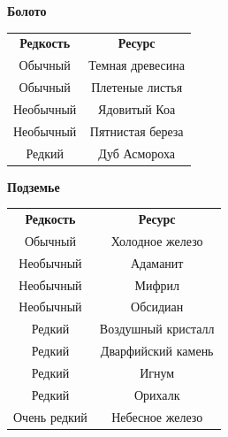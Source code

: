 \documentclass[a4paper, 9pt, twocolumn]{book}
\begin{document}
	\begin{table}[H]

		{\Large \textbf{Болото}}
		
		\centering
		
		\medspace 
		
		\begin{tabularx}{\linewidth}{C C}
			
			\textbf{Редкость} & \textbf{Ресурс} \\
			
			Обычный & Темная древесина \\
			
			Обычный & Плетеные листья \\
			
			Необычный & Ядовитый Коа \\
			
			Необычный & Пятнистая береза \\
			
			Редкий & Дуб Асмороха \\
			
		\end{tabularx}
	\end{table}
		
	\begin{table}[H]

		{\Large \textbf{Подземье}}
		
		\centering
		
		\medspace 
		
		\begin{tabularx}{\linewidth}{C C}
			
			\textbf{Редкость} & \textbf{Ресурс} \\
			
			Обычный & Холодное железо \\
			
			Необычный & Адаманит \\
			
			Необычный & Мифрил \\
			
			Необычный & Обсидиан \\
			
			Редкий & Воздушный кристалл \\
			
			Редкий & Дварфийский камень \\
			
			Редкий & Игнум \\
			
			Редкий & Орихалк \\
			
			Очень редкий & Небесное железо \\
			
		\end{tabularx}
	\end{table}
\end{document}
